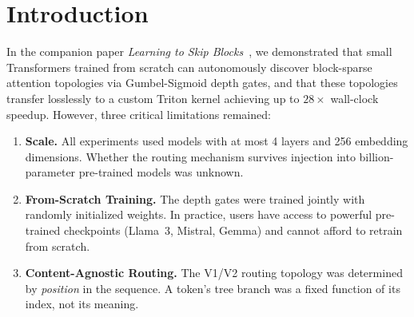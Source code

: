\documentclass[11pt,a4paper]{article}
\begin{document}
\begin{abstract}
producing a \emph{forest ensemble} across attention heads and enabling 78.1\% peer-to-peer communication savings in Topological Ring Attention. On QASPER LongBench, the True Tree router achieves 37.9 F1 at 58.9\% measured density (25\% theoretical budget), vastly outperforming a same-budget sliding window baseline (23.8 F1) and approaching the dense ceiling (42.5 F1). In production deployment via a custom GGML CUDA backend in \texttt{llama.cpp} on Gemma~4~31B (\href{https://huggingface.co/sneedjak/Adelic-Gemma-4-31B-it}{\texttt{sneedjak/Adelic-Gemma-4-31B-it}}), the architecture executes prompt processing at \textbf{277.5 tokens/second} and decoding at \textbf{31.2 tokens/second} with an $O(W + \log N)$ KV-cache footprint. To our knowledge, this is the first demonstration of differentiable discrete topology injection into a production-scale pre-trained LLM backed by machine-checked analytical bounds.
\end{abstract}

\section{Introduction}

In the companion paper \emph{Learning to Skip Blocks}~\citep{learningtoskip2026}, we demonstrated that small Transformers trained from scratch can autonomously discover block-sparse attention topologies via Gumbel-Sigmoid depth gates, and that these topologies transfer losslessly to a custom Triton kernel achieving up to $28\times$ wall-clock speedup. However, three critical limitations remained:

\begin{enumerate}
    \item \textbf{Scale.} All experiments used models with at most 4 layers and 256 embedding dimensions. Whether the routing mechanism survives injection into billion-parameter pre-trained models was unknown.
    \item \textbf{From-Scratch Training.} The depth gates were trained jointly with randomly initialized weights. In practice, users have access to powerful pre-trained checkpoints (Llama~3, Mistral, Gemma) and cannot afford to retrain from scratch.
    \item \textbf{Content-Agnostic Routing.} The V1/V2 routing topology was determined by \emph{position} in the sequence. A token's tree branch was a fixed function of its index, not its meaning.
\end{enumerate}
\end{document}
